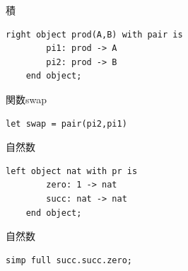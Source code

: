 \documentclass[pdflatex,12pt]{beamer}
\begin{document}
\begin{frame}[fragile]{積}
    \centering
    \normalsize
    \begin{lstlisting}[basicstyle=\ttfamily]
    right object prod(A,B) with pair is
        pi1: prod -> A
        pi2: prod -> B
    end object;
    \end{lstlisting}
\end{frame}

\begin{frame}[fragile]{関数swap}
    \centering
    \normalsize
    \begin{lstlisting}[basicstyle=\ttfamily]
    let swap = pair(pi2,pi1)
    \end{lstlisting}
\end{frame}

\begin{frame}[fragile]{自然数}
    \centering
    \normalsize
    \begin{lstlisting}[basicstyle=\ttfamily]
    left object nat with pr is
        zero: 1 -> nat
        succ: nat -> nat
    end object;
    \end{lstlisting}
\end{frame}

\begin{frame}[fragile]{自然数}
    \centering
    \normalsize
    \begin{lstlisting}[basicstyle=\ttfamily]
    simp full succ.succ.zero;
    \end{lstlisting}
\end{frame}
\end{document}
